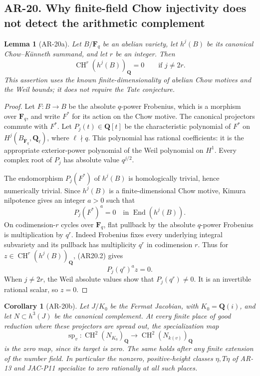\documentclass[11pt,a4paper]{article}
\newtheorem{lemma}[theorem]{Lemma}
\newtheorem{corollary}[theorem]{Corollary}
\begin{document}
\subsection*{AR-20. Why finite-field Chow injectivity does not detect the arithmetic complement}

\begin{lemma}[AR-20a]\label{ar20a}
Let \(B/\mathbf F_q\) be an abelian variety, let \(h^j(B)\) be its
canonical Chow--K\"unneth summand, and let \(r\) be an integer.
Then
\[
     \operatorname{CH}^r(h^j(B))_{\mathbf Q}=0
                     \qquad\text{if }j\ne2r.                 \tag{AR20.1}
\]
This assertion uses the known finite-dimensionality of abelian
Chow motives and the Weil bounds; it does not require the Tate
conjecture.
\end{lemma}

\begin{proof}
Let \(F:B\to B\) be the absolute \(q\)-power Frobenius, which is a
morphism over \(\mathbf F_q\), and write \(F^*\) for its action on
the Chow motive. The canonical projectors commute with \(F^*\).
Let \(P_j(t)\in\mathbf Q[t]\) be the characteristic polynomial of
\(F^*\) on \(H^j(B_{\overline{\mathbf F}_q},\mathbf Q_\ell)\),
where \(\ell\nmid q\). This polynomial has rational coefficients:
it is the appropriate exterior-power polynomial of the Weil
polynomial on \(H^1\). Every complex root of \(P_j\) has absolute
value \(q^{j/2}\).

The endomorphism \(P_j(F^*)\) of \(h^j(B)\) is homologically
trivial, hence numerically trivial. Since \(h^j(B)\) is a
finite-dimensional Chow motive, Kimura nilpotence gives an integer
\(a>0\) such that
\[
                    P_j(F^*)^a=0
             \quad\text{in }\operatorname{End}(h^j(B)).
             \tag{AR20.2}
\]
On codimension-\(r\) cycles over \(\mathbf F_q\), flat pullback by
the absolute \(q\)-power Frobenius is multiplication by \(q^r\).
Indeed Frobenius fixes every underlying integral subvariety and
its pullback has multiplicity \(q^r\) in codimension \(r\).
Thus for \(z\in\operatorname{CH}^r(h^j(B))_{\mathbf Q}\),
(AR20.2) gives
\[
                        P_j(q^r)^a z=0.
\]
When \(j\ne2r\), the Weil absolute values show that
\(P_j(q^r)\ne0\). It is an invertible rational scalar, so \(z=0\).
\end{proof}

\begin{corollary}[AR-20b]\label{ar20b}
Let \(J/K_0\) be the Fermat Jacobian, with
\(K_0=\mathbf Q(i)\), and let \(N\subset h^3(J)\) be the
canonical complement. At every finite place of good reduction
where these projectors are spread out, the specialization map
\[
 \operatorname{sp}_v:
 \operatorname{CH}^2(N_{K_0})_{\mathbf Q}
       \longrightarrow
 \operatorname{CH}^2(N_{k(v)})_{\mathbf Q}
                                                               \tag{AR20.3}
\]
is the zero map, since its target is zero. The same holds after
any finite extension of the number field.
In particular the nonzero, positive-height classes
\(\eta,T\eta\) of AR-13 and JAC-P11 specialize to zero rationally
at all such places.
\end{corollary}
\end{document}
